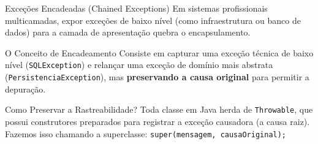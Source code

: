 \documentclass[9pt]{beamer}
\begin{document}
\begin{frame}{Exceções Encadeadas (Chained Exceptions)}
    Em sistemas profissionais multicamadas, expor exceções de baixo nível (como infraestrutura ou banco de dados) para a camada de apresentação quebra o encapsulamento.
    
    \vspace{0.2cm}
    
    \begin{block}{O Conceito de Encadeamento}
        Consiste em capturar uma exceção técnica de baixo nível (\texttt{SQLException}) e relançar uma exceção de domínio mais abstrata (\texttt{PersistenciaException}), mas \textbf{preservando a causa original} para permitir a depuração.
    \end{block}
    
    \begin{block}{Como Preservar a Rastreabilidade?}
        Toda classe em Java herda de \texttt{Throwable}, que possui construtores preparados para registrar a exceção causadora (a causa raiz). Fazemos isso chamando a superclasse:
        \centering\small
        \texttt{super(mensagem, causaOriginal);}
    \end{block}
\end{frame}
\end{document}
